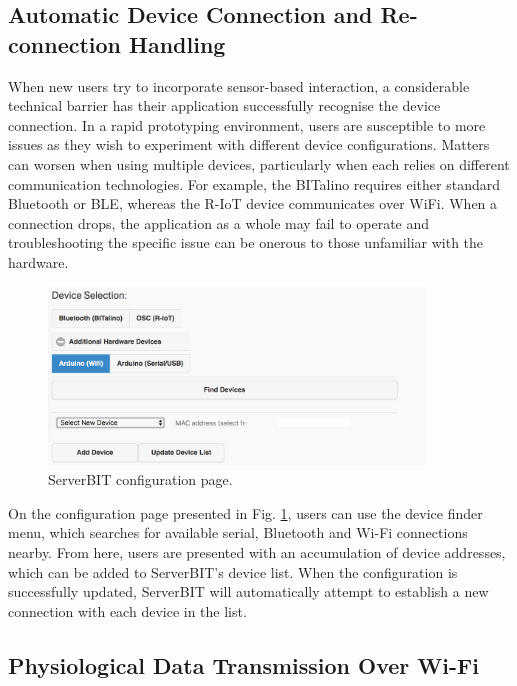 \subsection{Automatic Device Connection and Re-connection Handling}
When new users try to incorporate sensor-based interaction, a considerable technical barrier has their application successfully recognise the device connection. In a rapid prototyping environment, users are susceptible to more issues as they wish to experiment with different device configurations. Matters can worsen when using multiple devices, particularly when each relies on different communication technologies. For example, the BITalino requires either standard Bluetooth or BLE, whereas the R-IoT device communicates over WiFi. When a connection drops, the application as a whole may fail to operate and troubleshooting the specific issue can be onerous to those unfamiliar with the hardware.

\begin{figure}[htb!]
    \centering
    \includegraphics[width=100mm,scale=1.0]{Chapters/Figures/technical/ServerBIT/device_selection.png}
    \caption{ServerBIT configuration page.}
    \label{fig:dev_selection}
\end{figure}

On the configuration page presented in Fig. \ref{fig:dev_selection}, users can use the device finder menu, which searches for available serial, Bluetooth and Wi-Fi connections nearby. From here, users are presented with an accumulation of device addresses, which can be added to ServerBIT's device list. When the configuration is successfully updated, ServerBIT will automatically attempt to establish a new connection with each device in the list.

\subsection{Physiological Data Transmission Over Wi-Fi} \label{riot}

